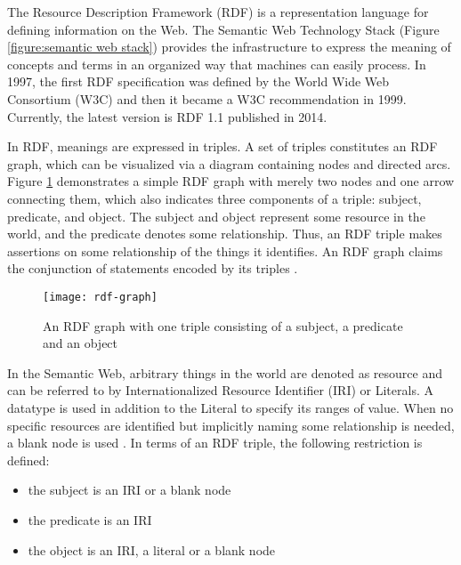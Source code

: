 The Resource Description Framework (RDF) is a representation language for defining information on the Web. The Semantic Web Technology Stack (Figure \ref{figure:semantic web stack}) provides the infrastructure to express the meaning of concepts and terms in an organized way that machines can easily process. In 1997, the first RDF specification was defined by the World Wide Web Consortium (W3C) and then it became a W3C recommendation in 1999. Currently, the latest version is RDF 1.1 \cite{Cyganiak2014} published in 2014.

In RDF, meanings are expressed in triples. A set of triples constitutes an RDF graph, which can be visualized via a diagram containing nodes and directed arcs. Figure \ref{figure:rdf example} demonstrates a simple RDF graph with merely two nodes and one arrow connecting them, which also indicates three components of a triple: subject, predicate, and object. The subject and object represent some resource in the world, and the predicate denotes some relationship. Thus, an RDF triple makes assertions on some relationship of the things it identifies. An RDF graph claims the conjunction of statements encoded by its triples \cite{Cyganiak2014}.

\begin{figure}[h]
\texttt{[image: rdf-graph]}
\centering
\caption{An RDF graph with one triple consisting of a subject, a predicate and an object}
\label{figure:rdf example}
\end{figure}

In the Semantic Web, arbitrary things in the world are denoted as resource and can be referred to by Internationalized Resource Identifier (IRI) or Literals. A datatype is used in addition to the Literal to specify its ranges of value. When no specific resources are identified but implicitly naming some relationship is needed, a blank node is used \cite{Cyganiak2014}. In terms of an RDF triple, the following restriction is defined: 
\medskip
\begin{itemize}
\item the subject is an IRI or a blank node
\item the predicate is an IRI
\item the object is an IRI, a literal or a blank node
\end{itemize}

